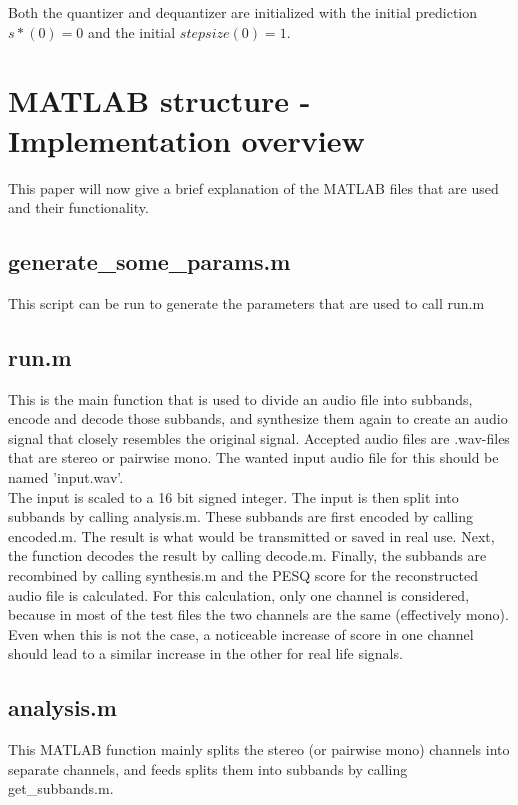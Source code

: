 \documentclass[a4paper]{article}
\begin{document}
Both the quantizer and dequantizer are initialized with the initial prediction $s*(0) = 0$ and the initial $stepsize(0) = 1$.

\section{MATLAB structure - Implementation overview}
This paper will now give a brief explanation of the MATLAB files that are used and their functionality.

\subsection{generate\_some\_params.m}
This script can be run to generate the parameters that are used to call run.m

\subsection{run.m}
This is the main function that is used to divide an audio file into subbands, encode and decode those subbands, and synthesize them again to create an audio signal that closely resembles the original signal. Accepted audio files are .wav-files that are stereo or pairwise mono. The wanted input audio file for this should be named 'input.wav'.
\\
The input is scaled to a 16 bit signed integer. The input is then split into subbands by calling analysis.m. These subbands are first encoded by calling encoded.m. The result is what would be transmitted or saved in real use. Next, the function decodes the result by calling decode.m. Finally, the subbands are recombined by calling synthesis.m and the PESQ score for the reconstructed audio file is calculated. For this calculation, only one channel is considered, because in most of the test files the two channels are the same (effectively mono). Even when this is not the case, a noticeable increase of score in one channel should lead to a similar increase in the other for real life signals.

\subsection{analysis.m}
This MATLAB function mainly splits the stereo (or pairwise mono) channels into separate channels, and feeds splits them into subbands by calling get\_subbands.m.
\end{document}
